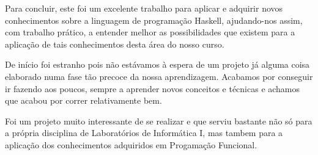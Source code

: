 \documentclass[a4paper, 12pt, portuguese]{article}
\begin{document}
Para concluir, este foi um excelente trabalho para aplicar e adquirir novos conhecimentos sobre a linguagem de programação Haskell, ajudando-nos assim, com trabalho prático, a entender melhor as possibilidades que existem para a aplicação de tais conhecimentos desta área do nosso curso.

De início foi estranho pois não estávamos à espera de um projeto já alguma coisa elaborado numa fase tão precoce da nossa aprendizagem. Acabamos por conseguir ir fazendo aos poucos, sempre a aprender novos conceitos e técnicas e achamos que acabou por correr relativamente bem.

Foi um projeto muito interessante de se realizar e que serviu bastante não só para a própria disciplina de Laboratórios de Informática I, mas tambem para a aplicação dos conhecimentos adquiridos em Progamação Funcional.
\end{document}
